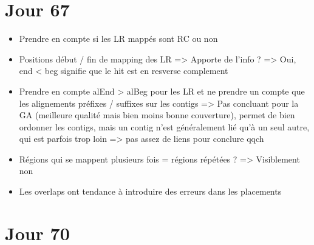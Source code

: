 \documentclass[12pt]{report}
\begin{document}
\section{Jour 67}

\begin{itemize}
	\item Prendre en compte si les LR mappés sont RC ou non 
	
	\item Positions début / fin de mapping des LR => Apporte de l'info ? => Oui, end < beg signifie que le hit est en resverse complement
	
	\item Prendre en compte alEnd > alBeg pour les LR et ne prendre un compte que les alignements préfixes / suffixes
		  sur les contigs => Pas concluant pour la GA (meilleure qualité mais bien moins bonne couverture), permet de bien ordonner
		  les contigs, mais un contig n'est généralement lié qu'à un seul autre, qui est parfois trop loin => pas assez de liens pour conclure qqch
		  
	\item Régions qui se mappent plusieurs fois = régions répétées ? => Visiblement non
	
	\item Les overlaps ont tendance à introduire des erreurs dans les placements
\end{itemize}

\section{Jour 70}
\end{document}
